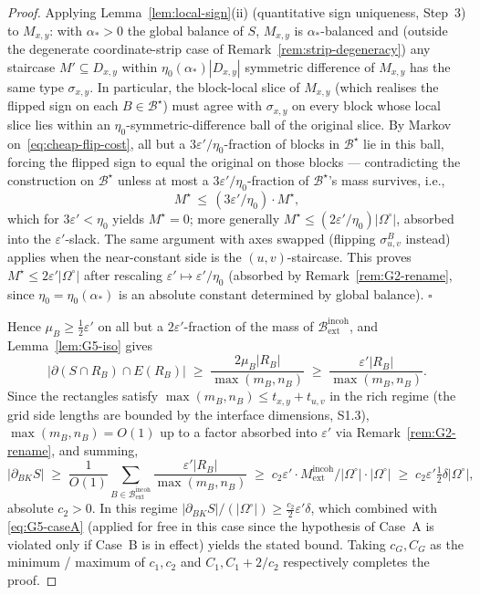 \begin{proof}
Applying Lemma~\ref{lem:local-sign}(ii) (quantitative sign uniqueness,
Step~3) to $M_{x,y}$: with $\alpha_*>0$ the global balance of $S$,
$M_{x,y}$ is $\alpha_*$-balanced and (outside the degenerate coordinate-strip
case of Remark~\ref{rem:strip-degeneracy}) any staircase $M'\subseteq D_{x,y}$
within $\eta_0(\alpha_*)|D_{x,y}|$ symmetric difference of $M_{x,y}$ has the
same type $\sigma_{x,y}$. In particular, the block-local slice of $\hat M_{x,y}$
(which realises the flipped sign on each $B\in\mathcal B^\star$) must agree
with $\sigma_{x,y}$ on every block whose local slice lies within an
$\eta_0$-symmetric-difference ball of the original slice. By
Markov on~\eqref{eq:cheap-flip-cost}, all but a $3\varepsilon'/\eta_0$-fraction
of blocks in $\mathcal B^\star$ lie in this ball, forcing the flipped sign
to equal the original on those blocks --- contradicting the construction on
$\mathcal B^\star$ unless at most a $3\varepsilon'/\eta_0$-fraction of
$\mathcal B^\star$'s mass survives, i.e.,
\[
M^\star\,\le\,(3\varepsilon'/\eta_0)\cdot M^\star,
\]
which for $3\varepsilon'<\eta_0$ yields $M^\star=0$; more generally
$M^\star\le (2\varepsilon'/\eta_0)|\Omega^\circ|$, absorbed into the $\varepsilon'$-slack.
The same argument with axes swapped (flipping $\sigma_{u,v}^B$ instead) applies
when the near-constant side is the $(u,v)$-staircase. This proves
$M^\star\le 2\varepsilon'|\Omega^\circ|$ after rescaling
$\varepsilon'\mapsto\varepsilon'/\eta_0$ (absorbed by Remark~\ref{rem:G2-rename},
since $\eta_0=\eta_0(\alpha_*)$ is an absolute constant determined by global
balance). \hfill$\square$

\medskip
\noindent Hence $\mu_B\ge\tfrac12\varepsilon'$ on all but a $2\varepsilon'$-fraction
of the mass of $\mathcal B_{\mathrm{ext}}^{\mathrm{incoh}}$, and
Lemma~\ref{lem:G5-iso} gives
\[
|\partial(S\cap R_B)\cap E(R_B)|\;\ge\;\frac{2\mu_B|R_B|}{\max(m_B,n_B)}\;\ge\;\frac{\varepsilon'|R_B|}{\max(m_B,n_B)}.
\]
Since the rectangles satisfy $\max(m_B,n_B)\le t_{x,y}+t_{u,v}$ in the
rich regime (the grid side lengths are bounded by the interface
dimensions, S1.3), $\max(m_B,n_B)=O(1)$ up to a factor absorbed into
$\varepsilon'$ via Remark~\ref{rem:G2-rename}, and summing,
\begin{equation}\label{eq:G5-caseB}
|\partial_{BK}S|\;\ge\;\frac{1}{O(1)}\sum_{B\in\mathcal B_{\mathrm{ext}}^{\mathrm{incoh}}}\!\!\frac{\varepsilon'|R_B|}{\max(m_B,n_B)}
\;\ge\;c_2\varepsilon'\cdot M_{\mathrm{ext}}^{\mathrm{incoh}}/|\Omega^\circ|\cdot|\Omega^\circ|
\;\ge\;c_2\varepsilon'\tfrac12\delta|\Omega^\circ|,
\end{equation}
absolute $c_2>0$. In this regime
$|\partial_{BK}S|/(|\Omega^\circ|)\ge\tfrac{c_2}{2}\varepsilon'\delta$,
which combined with \eqref{eq:G5-caseA} (applied for free in this case
since the hypothesis of Case~A is violated only if Case~B is in effect)
yields the stated bound. Taking $c_G,C_G$ as the minimum / maximum of
$c_1,c_2$ and $C_1,C_1+2/c_2$ respectively completes the proof.
\end{proof}

